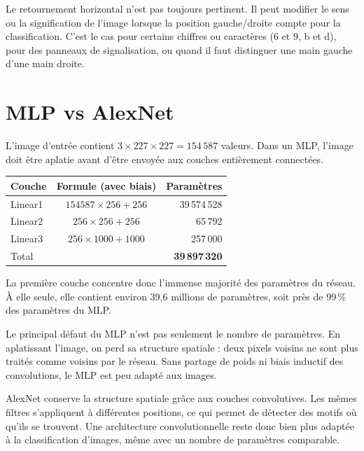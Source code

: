 \documentclass[11pt,a4paper]{article}
\begin{document}
Le retournement horizontal n'est pas toujours pertinent. Il peut modifier le sens
ou la signification de l'image lorsque la position gauche/droite compte pour la
classification. C'est le cas pour certains chiffres ou caractères (6 et 9, b et d),
pour des panneaux de signalisation, ou quand il faut distinguer une main gauche
d'une main droite.

\section{MLP vs AlexNet}

L'image d'entrée contient $3\times227\times227 = 154\,587$ valeurs. Dans un MLP,
l'image doit être aplatie avant d'être envoyée aux couches entièrement connectées.

\begin{table}[H]
\centering
\small
\begin{tabular}{@{}lcr@{}}
\toprule
Couche & Formule (avec biais) & Paramètres \\
\midrule
Linear1 & $154587\times256+256$ & 39\,574\,528 \\
Linear2 & $256\times256+256$ & 65\,792 \\
Linear3 & $256\times1000+1000$ & 257\,000 \\
\midrule
Total & & \textbf{39\,897\,320} \\
\bottomrule
\end{tabular}
\end{table}

La première couche concentre donc l'immense majorité des paramètres du réseau.
À elle seule, elle contient environ 39,6 millions de paramètres, soit près de
99\,\% des paramètres du MLP.

Le principal défaut du MLP n'est pas seulement le nombre de paramètres.
En aplatissant l'image, on perd sa structure spatiale : deux pixels voisins
ne sont plus traités comme voisins par le réseau. Sans partage de poids ni
biais inductif des convolutions, le MLP est peu adapté aux images.

AlexNet conserve la structure spatiale grâce aux couches convolutives.
Les mêmes filtres s'appliquent à différentes positions, ce qui permet de
détecter des motifs où qu'ils se trouvent. Une architecture convolutionnelle
reste donc bien plus adaptée à la classification d'images, même avec un
nombre de paramètres comparable.
\end{document}
